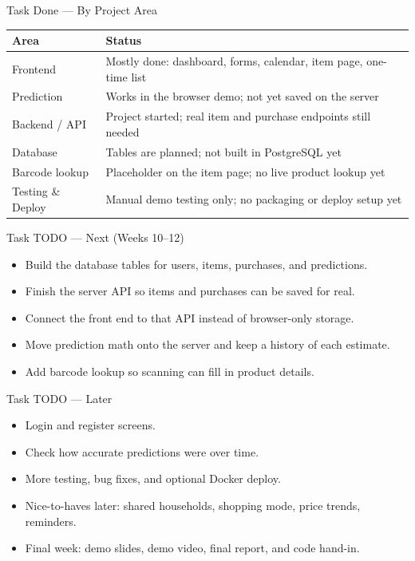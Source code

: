 \documentclass[aspectratio=169]{beamer}
\begin{document}
\begin{frame}{Task Done --- By Project Area}
  \small
  \begin{tabularx}{\linewidth}{>{\raggedright\arraybackslash}p{3.1cm} X}
    \toprule
    \textbf{Area} & \textbf{Status} \\
    \midrule
    Frontend &
      Mostly done: dashboard, forms, calendar, item page, one-time list \\[4pt]
    Prediction &
      Works in the browser demo; not yet saved on the server \\[4pt]
    Backend / API &
      Project started; real item and purchase endpoints still needed \\[4pt]
    Database &
      Tables are planned; not built in PostgreSQL yet \\[4pt]
    Barcode lookup &
      Placeholder on the item page; no live product lookup yet \\[4pt]
    Testing \& Deploy &
      Manual demo testing only; no packaging or deploy setup yet \\
    \bottomrule
  \end{tabularx}
\end{frame}

\begin{frame}{Task TODO --- Next (Weeks 10--12)}
  \begin{itemize}
    \item Build the database tables for users, items, purchases, and predictions.
    \item Finish the server API so items and purchases can be saved for real.
    \item Connect the front end to that API instead of browser-only storage.
    \item Move prediction math onto the server and keep a history of each estimate.
    \item Add barcode lookup so scanning can fill in product details.
  \end{itemize}
\end{frame}

\begin{frame}{Task TODO --- Later}
  \begin{itemize}
    \item Login and register screens.
    \item Check how accurate predictions were over time.
    \item More testing, bug fixes, and optional Docker deploy.
    \item Nice-to-haves later: shared households, shopping mode, price trends, reminders.
    \item Final week: demo slides, demo video, final report, and code hand-in.
  \end{itemize}
\end{frame}
\end{document}
